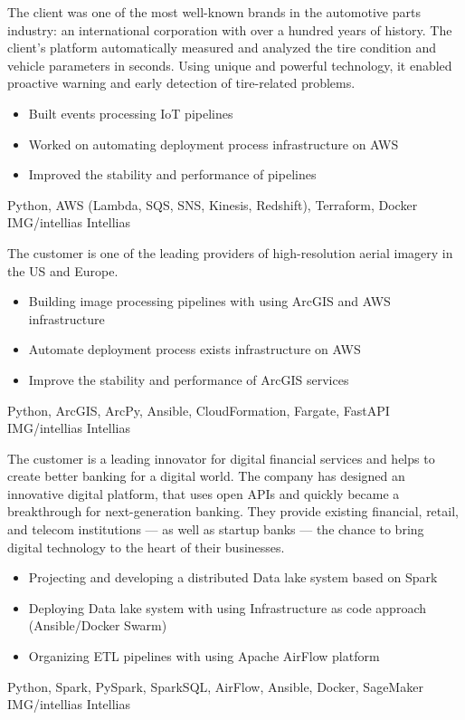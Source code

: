 \documentclass[paper=a4,fontsize=11pt]{temp} %
\begin{document}

\noindent

{
The client was one of the most well-known brands in the automotive parts
industry: an international corporation with over a hundred years of history.
The client’s platform automatically measured and analyzed the tire condition
and vehicle parameters in seconds. Using unique and powerful technology, it
enabled proactive warning and early detection of tire-related problems.
}
{
\begin{itemize}
    \setlength\itemsep{0em}
    \item Built events processing IoT pipelines 
    \item Worked on automating deployment process infrastructure on AWS 
    \item Improved the stability and performance of pipelines 
\end{itemize}
}
{Python, AWS (Lambda, SQS, SNS, Kinesis, Redshift), Terraform, Docker}
{IMG/intellias}
{Intellias}

\sepspace

{The customer is one of the leading providers of high-resolution aerial imagery in the US and Europe.}
{
\begin{itemize}
    \setlength\itemsep{0em}
    \item Building image processing pipelines with using ArcGIS and AWS infrastructure
    \item Automate deployment process exists infrastructure on AWS
    \item Improve the stability and performance of ArcGIS services
\end{itemize}
}
{Python, ArcGIS, ArcPy, Ansible, CloudFormation, Fargate, FastAPI}
{IMG/intellias}
{Intellias}

\sepspace

{The customer is a leading innovator for digital financial services and helps to create better banking for a digital world.
The company has designed an innovative digital platform, that uses open APIs and quickly became a breakthrough for
next-generation banking. They provide existing financial, retail, and telecom institutions — as well as startup banks —
the chance to bring digital technology to the heart of their businesses.}
{
\begin{itemize}
    \setlength\itemsep{0em}
    \item Projecting and developing a distributed Data lake system based on Spark
    \item Deploying Data lake system with using Infrastructure as code approach (Ansible/Docker Swarm)
    \item Organizing ETL pipelines with using Apache AirFlow platform
\end{itemize}
}
{Python, Spark, PySpark, SparkSQL, AirFlow, Ansible, Docker, SageMaker}
{IMG/intellias}
{Intellias}
\end{document}
